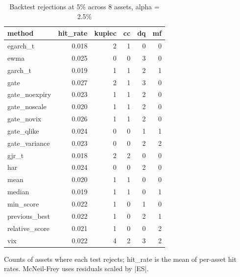 \begin{table}[t]
\centering
\small
\caption{Backtest rejections at 5\% across 8 assets, alpha = 2.5\%}
\label{tab:backtests}
\begin{tabular}{lrrrrr}
\toprule
method & hit\_rate & kupiec & cc & dq & mf \\
\midrule
egarch\_t & 0.018 & 2 & 1 & 0 & 0 \\
ewma & 0.025 & 0 & 0 & 3 & 0 \\
garch\_t & 0.019 & 1 & 1 & 2 & 1 \\
gate & 0.027 & 2 & 1 & 3 & 0 \\
gate\_noexpiry & 0.023 & 1 & 1 & 2 & 0 \\
gate\_noscale & 0.020 & 1 & 1 & 2 & 0 \\
gate\_novix & 0.026 & 1 & 1 & 2 & 0 \\
gate\_qlike & 0.024 & 0 & 0 & 1 & 1 \\
gate\_variance & 0.023 & 0 & 0 & 2 & 2 \\
gjr\_t & 0.018 & 2 & 2 & 0 & 0 \\
har & 0.024 & 0 & 0 & 2 & 0 \\
mean & 0.020 & 1 & 1 & 0 & 0 \\
median & 0.019 & 1 & 1 & 0 & 1 \\
min\_score & 0.022 & 1 & 0 & 1 & 0 \\
previous\_best & 0.022 & 1 & 0 & 2 & 1 \\
relative\_score & 0.021 & 1 & 0 & 0 & 2 \\
vix & 0.022 & 4 & 2 & 3 & 2 \\
\bottomrule
\end{tabular}
\par\footnotesize Counts of assets where each test rejects; hit\_rate is the mean of per-asset hit rates. McNeil-Frey uses residuals scaled by |ES|.
\end{table}

